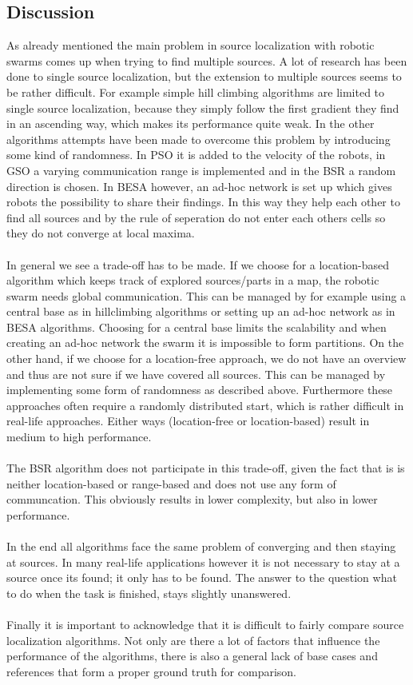 	\subsection{Discussion}
  	As already mentioned the main problem in source localization with robotic swarms comes up when trying to find multiple sources. A lot of research has been done to single source localization, but the extension to multiple sources seems to be rather difficult. For example simple hill climbing algorithms are limited to single source localization, because they simply follow the first gradient they find in an ascending way, which makes its performance quite weak. In the other algorithms  attempts have been made to overcome this problem by introducing some kind of randomness. In PSO it is added to the velocity of the robots, in GSO a varying communication range is implemented and in the BSR a random direction is chosen. In BESA however, an ad-hoc network is set up which gives robots the possibility to share their findings. In this way they help each other to find all sources and by the rule of seperation do not enter each others cells so they do not converge at local maxima. \\
	\\
	In general we see a trade-off has to be made. If we choose for a location-based algorithm which keeps track of explored sources/parts in a map, the robotic swarm needs global communication. This can be managed by for example using a central base as in hillclimbing algorithms or setting up an ad-hoc network as in BESA algorithms. Choosing for a central base limits the scalability and when creating an ad-hoc network the swarm it is impossible to form partitions. On the other hand, if we choose for a location-free approach, we do not have an overview and thus are not sure if we have covered all sources. This can be managed by implementing some form of randomness as described above. Furthermore these approaches often require a randomly distributed start, which is rather difficult in real-life approaches. Either ways (location-free or location-based) result in medium to high performance.\\
	\\
	The BSR algorithm does not participate in this trade-off, given the fact that is is neither location-based or range-based and does not use any form of communcation. This obviously results in lower complexity, but also in lower performance. \\
	\\
	In the end all algorithms face the same problem of converging and then staying at sources. In many real-life applications however it is not necessary to stay at a source once its found; it only has to be found. The answer to the question what to do when the task is finished, stays slightly unanswered.\\
	\\
	Finally it is important to acknowledge that it is difficult to fairly compare source localization algorithms. Not only are there a lot of factors that influence the performance of the algorithms, there is also a general lack of base cases and references that form a proper ground truth for comparison.

